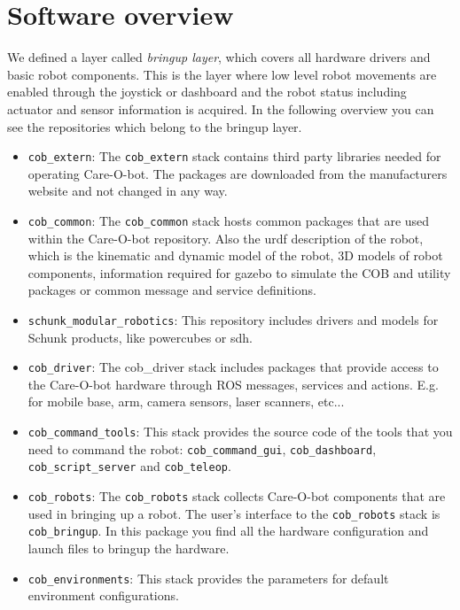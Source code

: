 \section{Software overview}\label{sec:software_overview}
We defined a layer called \textit{bringup layer}, which covers all hardware drivers and basic robot components. This is the layer where low level robot movements are enabled through the joystick or dashboard and the robot status including actuator and sensor information is acquired. In the following overview you can see the repositories which belong to the bringup layer.
\begin{itemize}
\item \texttt{cob\_extern}: The \texttt{cob\_extern} stack contains third party libraries needed for operating Care-O-bot. The packages are downloaded from the manufacturers website and not changed in any way.
\item \texttt{cob\_common}: The \texttt{cob\_common} stack hosts common packages that are used within the Care-O-bot repository. Also the urdf description of the robot, which is the kinematic and dynamic model of the robot, 3D models of robot components, information required for gazebo to simulate the COB and utility packages or common message and service definitions.
\item \texttt{schunk\_modular\_robotics}: This repository includes drivers and models for Schunk products, like powercubes or sdh.
\item \texttt{cob\_driver}: The cob\_driver stack includes packages that provide access to the Care-O-bot hardware through ROS messages, services and actions. E.g. for mobile base, arm, camera sensors, laser scanners, etc...
\item \texttt{cob\_command\_tools}: This stack provides the source code of the tools that you need to command the robot: \texttt{cob\_command\_gui}, \texttt{cob\_dashboard}, \texttt{cob\_script\_server} and \texttt{cob\_teleop}.
\item \texttt{cob\_robots}:  The \texttt{cob\_robots} stack collects Care-O-bot components that are used in bringing up a robot. The user's interface to the \texttt{cob\_robots} stack is \texttt{cob\_bringup}. In this package you find all the hardware configuration and launch files to bringup the hardware.
\item \texttt{cob\_environments}: This stack provides the parameters for default environment configurations.
\end{itemize}

